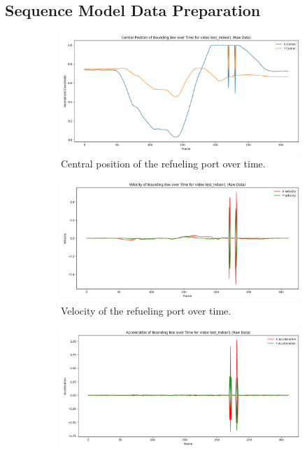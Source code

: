 \documentclass[12pt,oneside]{book} %
\begin{document}
\subsection{Sequence Model Data Preparation}
\begin{figure}[H]
    \centering
    \begin{subfigure}[t]{0.6\textwidth}
        \includegraphics[width=\textwidth]{figures/bbox_metrics/test_indoor1 (Raw Data)_central_position.png}
        \caption{Central position of the refueling port over time.}
        \label{fig:central-position-test-indoor1}
    \end{subfigure}
    \hfill
    \begin{subfigure}[t]{0.6\textwidth}
        \includegraphics[width=\textwidth]{figures/bbox_metrics/test_indoor1 (Raw Data)_velocity.png}
        \caption{Velocity of the refueling port over time.}
        \label{fig:velocity-test-indoor1}
    \end{subfigure}
    \vfill
    \begin{subfigure}[t]{0.6\textwidth}
        \includegraphics[width=\textwidth]{figures/bbox_metrics/test_indoor1 (Raw Data)_acceleration.png}

\end{subfigure}
\end{figure}
\end{document}
